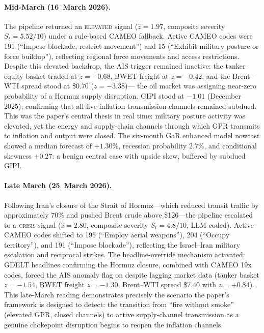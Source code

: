 \documentclass[12pt]{article}
\begin{document}
\paragraph{Mid-March (16~March 2026).}
The pipeline returned an \textsc{elevated} signal ($\hat{z} = 1.97$,
composite severity $S_t = 5.52/10$) under a rule-based CAMEO fallback.
Active CAMEO codes were 191 (``Impose blockade, restrict movement'')
and 15 (``Exhibit military posture or force buildup''),
reflecting regional force movements and access restrictions.
Despite this elevated backdrop, the AIS trigger remained inactive:
the tanker equity basket traded at $z = -0.68$, BWET freight at $z = -0.42$,
and the Brent--WTI spread stood at \$0.70 ($z = -3.38$)---
the oil market was assigning near-zero probability of a Hormuz
supply disruption.
GIPI stood at $-1.01$ (December 2025), confirming that all five
inflation transmission channels remained subdued.
This was the paper's central thesis in real time: military posture
activity was elevated, yet the energy and supply-chain channels through
which GPR transmits to inflation and output were closed.
The six-month GaR enhanced model nowcast showed a median forecast of
$+1.30\%$, recession probability 2.7\%, and conditional skewness $+0.27$:
a benign central case with upside skew, buffered by subdued GIPI.

\paragraph{Late March (25~March 2026).}
Following Iran's closure of the Strait of Hormuz---which reduced transit
traffic by approximately 70\% and pushed Brent crude above \$126---the
pipeline escalated to a \textsc{crisis} signal ($\hat{z} = 2.80$,
composite severity $S_t = 4.8/10$, LLM-coded).
Active CAMEO codes shifted to 195 (``Employ aerial weapons''),
204 (``Occupy territory''), and 191 (``Impose blockade''),
reflecting the Israel--Iran military escalation and reciprocal strikes.
The headline-override mechanism activated: GDELT headlines confirming
the Hormuz closure, combined with CAMEO 19x codes, forced the AIS
anomaly flag on despite lagging market data (tanker basket $z = -1.54$,
BWET freight $z = -1.30$, Brent--WTI spread \$7.40 with $z = +0.84$).
This late-March reading demonstrates precisely the scenario the paper's
framework is designed to detect: the transition from ``fire without
smoke'' (elevated GPR, closed channels) to active supply-channel
transmission as a genuine chokepoint disruption begins to reopen the
inflation channels.
\end{document}
